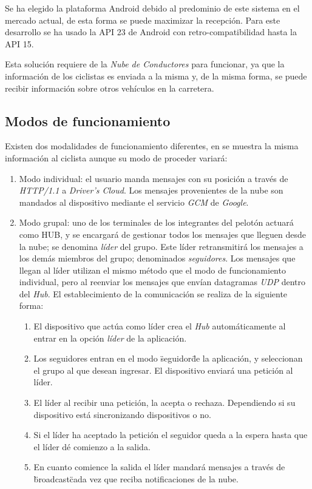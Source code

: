 Se ha elegido la plataforma Android debido al predominio de este sistema en el mercado actual, de esta forma se puede maximizar la recepción. Para este desarrollo se ha usado la API 23 de Android con retro-compatibilidad hasta la API 15.

Esta solución requiere de la \emph{Nube de Conductores} para funcionar, ya que la información de los ciclistas es enviada a la misma y, de la misma forma, se puede recibir información sobre otros vehículos en la carretera.

\subsection{Modos de funcionamiento}\label{ssection:commHUB}
Existen dos modalidades de funcionamiento diferentes, en se muestra la misma información al ciclista aunque su modo de proceder variará:
		
\begin{enumerate}
	\item Modo individual: el usuario manda mensajes con su posición a través de \emph{HTTP/1.1} a \emph{Driver's Cloud}. Los mensajes provenientes de la nube son mandados al dispositivo mediante el servicio \emph{GCM} de \emph{Google}.	
	\item Modo grupal: uno de los terminales de los integrantes del pelotón actuará como HUB, y se encargará de gestionar todos los mensajes que lleguen desde la nube; se denomina \emph{líder} del grupo. Este líder retransmitirá los mensajes a los demás miembros del grupo; denominados \emph{seguidores}. Los mensajes que llegan al líder utilizan el mismo método que el modo de funcionamiento individual, pero al reenviar los mensajes que envían datagramas \emph{UDP} dentro del \emph{Hub}. El establecimiento de la comunicación se realiza de la siguiente forma:
	\begin{enumerate}
		\item El dispositivo que actúa como líder crea el \emph{Hub} automáticamente al entrar en la opción \emph{líder} de la aplicación.
		\item Los seguidores entran en el modo \"seguidor\" de la aplicación, y seleccionan el grupo al que desean ingresar. El dispositivo enviará una petición al líder.
		\item El líder al recibir una petición, la acepta o rechaza. Dependiendo si su dispositivo está sincronizando dispositivos o no.
		\item Si el líder ha aceptado la petición el seguidor queda a la espera hasta que el líder dé comienzo a la salida.
		\item En cuanto comience la salida el líder mandará mensajes a través de \"broadcast\" cada vez que reciba notificaciones de la nube.
	\end{enumerate}
\end{enumerate}

